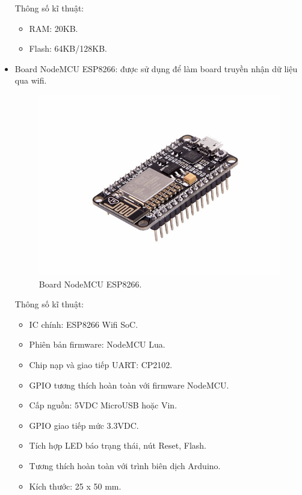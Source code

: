 \documentclass[a4paper,12pt,oneside]{article}
\begin{document}
\begin{itemize}
\noindent Thông số kĩ thuật\cite{dientuachau}:
\begin{itemize}
\item RAM: 20KB.
\item Flash: 64KB/128KB.
\end{itemize}

\item Board NodeMCU ESP8266: được sử dụng để làm board truyền nhận dữ liệu qua wifi.
\begin{figure}[H]
	\centering
	\includegraphics[scale=.4]{hinh/NodeMCU.jpg}
	\caption{Board NodeMCU ESP8266\cite{dientuachau}.}
\end{figure}
\noindent Thông số kĩ thuật\cite{dientuachau}:
	\begin{itemize}
	\item IC chính: ESP8266 Wifi SoC.
	\item Phiên bản firmware: NodeMCU Lua.
	\item Chip nạp và giao tiếp UART: CP2102.
	\item GPIO tương thích hoàn toàn với firmware NodeMCU.
	\item Cấp nguồn: 5VDC MicroUSB hoặc Vin.
	\item GPIO giao tiếp mức 3.3VDC.
	\item Tích hợp LED báo trạng thái, nút Reset, Flash.
	\item Tương thích hoàn toàn với trình biên dịch Arduino.
	\item Kích thước: 25 x 50 mm.
	\end{itemize}

\end{itemize}
\end{document}
